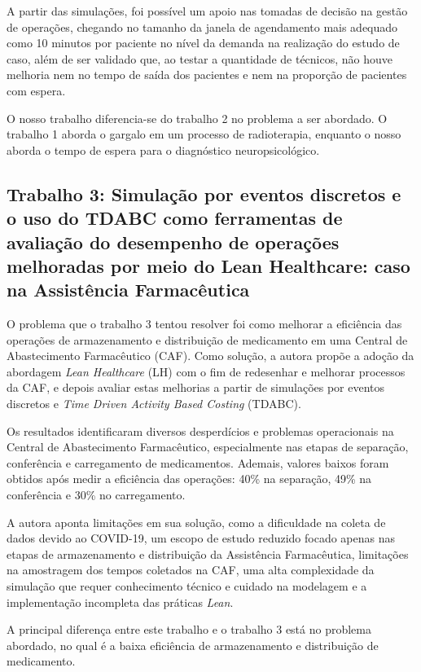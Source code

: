 \documentclass[
    12pt,                %
    openright,           %
    oneside,             %
    a4paper,             %
    english,             %
    brazil               %
]{abntex2}
\begin{document}
A partir das simulações, foi possível um apoio nas tomadas de decisão na gestão de operações, chegando no tamanho da janela de agendamento mais adequado como 10 minutos por paciente no nível da demanda na realização do estudo de caso, além de ser validado que, ao testar a quantidade de técnicos, não houve melhoria nem no tempo de saída dos pacientes e nem na proporção de pacientes com espera.

O nosso trabalho diferencia-se do trabalho 2 no problema a ser abordado. O trabalho 1 aborda o gargalo em um processo de radioterapia, enquanto o nosso aborda o tempo de espera para o diagnóstico neuropsicológico.

\subsection{Trabalho 3: Simulação por eventos discretos e o uso do TDABC como ferramentas de avaliação do desempenho de operações melhoradas por meio do Lean Healthcare: caso na Assistência Farmacêutica \cite{Bittencourt2022}}

O problema que o trabalho 3 tentou resolver foi como melhorar a eficiência das operações de armazenamento e distribuição de medicamento em uma Central de Abastecimento Farmacêutico (CAF). Como solução, a autora propõe a adoção da abordagem \textit{Lean Healthcare} (LH) com o fim de redesenhar e melhorar processos da CAF, e depois avaliar estas melhorias a partir de simulações por eventos discretos e \textit{Time Driven Activity Based Costing} (TDABC).

Os resultados identificaram diversos desperdícios e problemas operacionais na Central de Abastecimento Farmacêutico, especialmente nas etapas de separação, conferência e carregamento de medicamentos. Ademais, valores baixos foram obtidos após medir a eficiência das operações: 40\% na separação, 49\% na conferência e 30\% no carregamento.

A autora aponta limitações em sua solução, como a dificuldade na coleta de dados devido ao COVID-19, um escopo de estudo reduzido focado apenas nas etapas de armazenamento e distribuição da Assistência Farmacêutica, limitações na amostragem dos tempos coletados na CAF, uma alta complexidade da simulação que requer conhecimento técnico e cuidado na modelagem e a implementação incompleta das práticas \textit{Lean}.

A principal diferença entre este trabalho e o trabalho 3 está no problema abordado, no qual é a baixa eficiência de armazenamento e distribuição de medicamento.
\end{document}
